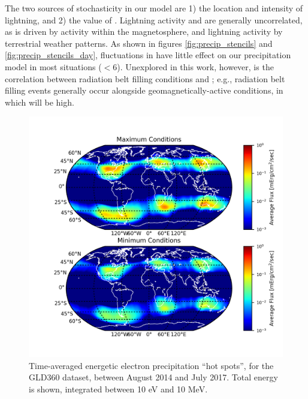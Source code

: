 The two sources of stochasticity in our model are 1) the location and intensity of lightning, and 2) the value of \kp{}. Lightning activity and \kp{} are generally uncorrelated, as \kp{} is driven by activity within the magnetosphere, and lightning activity by terrestrial weather patterns. As shown in figures \ref{fig:precip_stencils} and \ref{fig:precip_stencils_day}, fluctuations in \kp{} have little effect on our precipitation model in most situations (\kp{}$ < 6$). Unexplored in this work, however, is the correlation between radiation belt filling conditions and \kp{}; e.g., radiation belt filling events generally occur alongside geomagnetically-active conditions, in which \kp{} will be high.

\begin{figure}[]
\begin{center}
\includegraphics{figures/global_precip_map_max_min.png}
\caption[Global energy deposition ``hot spots'' for maximal and minimal radiation belt populations]{Time-averaged energetic electron precipitation ``hot spots'', for the GLD360 dataset, between August 2014 and July 2017. Total energy is shown, integrated between 10 eV and 10 MeV. }
\label{fig:global_precip_map_max_min}
\end{center}
\end{figure}

